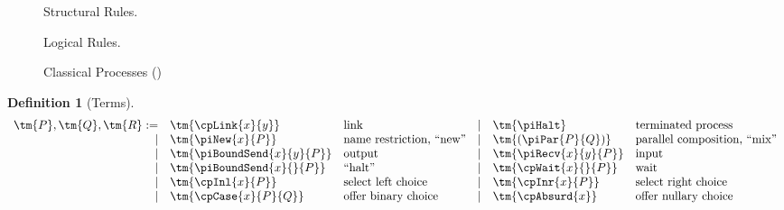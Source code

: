 \documentclass[submission,copyright,creativecommons]{eptcs}
\newtheorem{definition}{Definition}
\begin{document}
\begin{figure*}[!htb]
  Structural Rules.
  \begin{center} \cpInfAx     \cpInfCut      \end{center}

  Logical Rules.
  \begin{center} \cpInfTens   \cpInfParr     \end{center}
  \begin{center} \cpInfOne    \cpInfBot      \end{center}
  \begin{center}       \end{center}
  \begin{center} \cpInfWith                  \end{center}
  \begin{center} \cpInfNil    \cpInfTop      \end{center}

  \caption{Classical Processes (\cp)}
  \label{fig:cp}
\end{figure*}


\begin{definition}[Terms]\label{def:hcp-terms}
  \begin{gather*}
    \begin{array}{rllrll}
      \tm{P}, \tm{Q}, \tm{R}
           :=& \tm{\cpLink{x}{y}}         &\text{link}
      &  \mid& \tm{\piHalt}               &\text{terminated process}
      \\ \mid& \tm{\piNew{x}{P}}          &\text{name restriction, ``new''}
      &  \mid& \tm{( \piPar{P}{Q} )}      &\text{parallel composition, ``mix''}
      \\ \mid& \tm{\piBoundSend{x}{y}{P}} &\text{output}
      &  \mid& \tm{\piRecv{x}{y}{P}}      &\text{input}
      \\ \mid& \tm{\piBoundSend{x}{}{P}}  &\text{``halt''}
      &  \mid& \tm{\cpWait{x}{}{P}}       &\text{wait}
      \\ \mid& \tm{\cpInl{x}{P}}          &\text{select left choice}
      &  \mid& \tm{\cpInr{x}{P}}          &\text{select right choice}
      \\ \mid& \tm{\cpCase{x}{P}{Q}}      &\text{offer binary choice}
      &  \mid& \tm{\cpAbsurd{x}}          &\text{offer nullary choice}
    \end{array}
  \end{gather*}
\end{definition}
\end{document}
